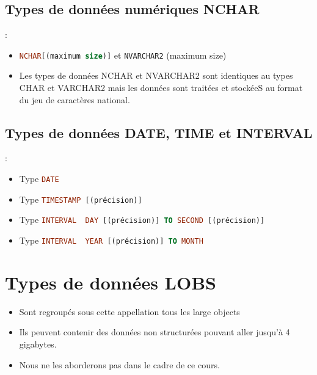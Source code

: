 \documentclass[10pt]{beamer}
\begin{document}
\subsection{Types de données numériques NCHAR}
\begin{frame}{\secname : \subsecname}
    \begin{itemize}
        \item \lstinline[language=sql]!NCHAR[(maximum size)]! et \lstinline[language=sql]!NVARCHAR2! (maximum size)
        \item Les types de données NCHAR et NVARCHAR2 sont identiques au types CHAR et VARCHAR2 mais les données sont traitées et stockéeS au format du jeu de caractères national.
    \end{itemize}
\end{frame}

\subsection{Types de données DATE, TIME et INTERVAL}
\begin{frame}{\secname : \subsecname}
    \begin{itemize}
        \item Type \lstinline[language=sql]!DATE!
        \item Type \lstinline[language=sql]!TIMESTAMP [(précision)]!
        \item Type \lstinline[language=sql]!INTERVAL  DAY [(précision)] TO SECOND [(précision)]!
        \item Type \lstinline[language=sql]!INTERVAL  YEAR [(précision)] TO MONTH!
    \end{itemize}
\end{frame}

\section{Types de données LOBS}
\begin{frame}{\secname}
    \begin{itemize}
        \item Sont regroupés sous cette appellation tous les large objects
        \item Ils peuvent contenir des données non structurées pouvant aller jusqu'à 4 gigabytes.
        \item Nous ne les aborderons pas dans le cadre de ce cours.
    \end{itemize}
\end{frame}
\end{document}
